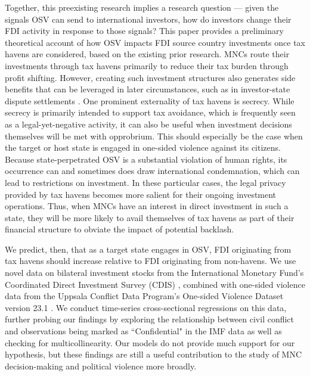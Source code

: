 \documentclass[11pt, titlepage]{article} %
\begin{document}
Together, this preexisting research implies a research question — given the signals OSV can send to international investors, how do investors change their FDI activity in response to those signals? This paper provides a preliminary theoretical account of how OSV impacts FDI source country investments once tax havens are considered, based on the existing prior research. MNCs route their investments through tax havens primarily to reduce their tax burden through profit shifting. However, creating such investment structures also generates side benefits that can be leveraged in later circumstances, such as in investor-state dispute settlements \parencite{thrallSpilloverEffectsInternational2021}. One prominent externality of tax havens is secrecy. While secrecy is primarily intended to support tax avoidance, which is frequently seen as a legal-yet-negative activity, it can also be useful when investment decisions themselves will be met with opprobrium. This should especially be the case when the target or host state is engaged in one-sided violence against its citizens. Because state-perpetrated OSV  is a substantial violation of human rights, its occurrence can and sometimes does draw international condemnation, which can lead to restrictions on investment. In these particular cases, the legal privacy provided by tax havens becomes more salient for their ongoing investment operations. Thus, when MNCs have an interest in direct investment in such a state, they will be more likely to avail themselves of tax havens as part of their financial structure to obviate the impact of potential backlash.  

We predict, then, that as a target state engages in OSV, FDI originating from tax havens should increase relative to FDI originating from non-havens. We use novel data on bilateral investment stocks from the International Monetary Fund's Coordinated Direct Investment Survey (CDIS) \parencite{internationalmonetaryfundCoordinatedDirectInvestment2015}, combined with one-sided violence data from the Uppsala Conflict Data Program’s One-sided Violence Dataset version 23.1 \parencite{eck2007one,davies2023organized}.  We conduct time-series cross-sectional regressions on this data, further probing our findings by exploring the relationship between civil conflict and observations being marked as ``Confidential" in the IMF data as well as checking for multicollinearity. Our models do not provide much support for our hypothesis, but these findings are still a useful contribution to the study of MNC decision-making and political violence more broadly.
\end{document}

